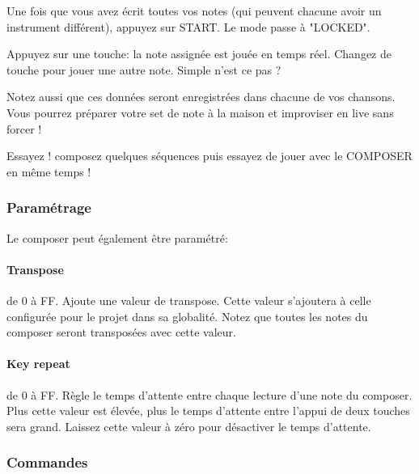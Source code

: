 \documentclass[12pt,a4paper]{article}
\begin{document}
    Une fois que vous avez écrit toutes vos notes (qui peuvent chacune avoir un instrument différent), appuyez sur START. Le mode passe à "LOCKED".\medskip
    
    Appuyez sur une touche: la note assignée est jouée en temps réel. Changez de touche pour jouer une autre note. Simple n'est ce pas ?\medskip
    
    Notez aussi que ces données seront enregistrées dans chacune de vos chansons. Vous pourrez préparer votre set de note à la maison et improviser en live sans forcer !\medskip
    
    Essayez ! composez quelques séquences puis essayez de jouer avec le COMPOSER en même temps !\medskip
    
    \subsubsection{Paramétrage}
    
    Le composer peut également être paramétré:
    
    
        \paragraph{Transpose} de 0 à FF. Ajoute une valeur de transpose. Cette valeur s'ajoutera à celle configurée pour le projet dans sa globalité. Notez que toutes les notes du composer seront transposées avec cette valeur.
        
        \paragraph{Key repeat} de 0 à FF. Règle le temps d'attente entre chaque lecture d'une note du composer. Plus cette valeur est élevée, plus le temps d'attente entre l'appui de deux touches sera grand. Laissez cette valeur à zéro pour désactiver le temps d'attente.
    
        \subsubsection{Commandes}
        
\end{document}
